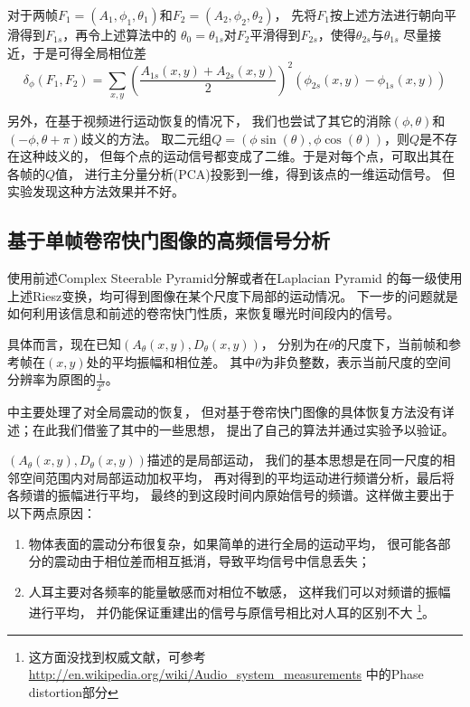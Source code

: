 对于两帧$F_1 = (A_1, \phi_1, \theta_1)$和$F_2 = (A_2, \phi_2, \theta_2)$，
先将$F_1$按上述方法进行朝向平滑得到$F_{1s}$，再令上述算法中的
$\theta_0=\theta_{1s}$对$F_2$平滑得到$F_{2s}$，使得$\theta_{2s}$与$\theta_{1s}$
尽量接近，于是可得全局相位差
\begin{equation}
    \delta_\phi(F_1, F_2) = \sum_{x, y}
    \left(\frac{A_{1s}(x, y) + A_{2s}(x, y)}{2}\right)^2(\phi_{2s}(x, y) -
    \phi_{1s}(x, y))
\end{equation}

另外，在基于视频进行运动恢复的情况下，
我们也尝试了其它的消除$(\phi, \theta)$和$(-\phi, \theta+\pi)$歧义的方法。
取二元组$Q=(\phi\sin(\theta), \phi\cos(\theta))$，则$Q$是不存在这种歧义的，
但每个点的运动信号都变成了二维。于是对每个点，可取出其在各帧的$Q$值，
进行主分量分析(PCA)投影到一维，得到该点的一维运动信号。
但实验发现这种方法效果并不好。


\subsection{基于单帧卷帘快门图像的高频信号分析\label{sec:algo-hf}}
使用前述Complex Steerable Pyramid分解或者在Laplacian Pyramid
的每一级使用上述Riesz变换，均可得到图像在某个尺度下局部的运动情况。
下一步的问题就是如何利用该信息和前述的卷帘快门性质，来恢复曝光时间段内的信号。

具体而言，现在已知$(A_\theta(x, y), D_\theta(x, y))$，
分别为在$\theta$的尺度下，当前帧和参考帧在$(x, y)$处的平均振幅和相位差。
其中$\theta$为非负整数，表示当前尺度的空间分辨率为原图的$\frac{1}{2^\theta}$。

\cite{Davis2014VisualMic}中主要处理了对全局震动的恢复，
但对基于卷帘快门图像的具体恢复方法没有详述；在此我们借鉴了其中的一些思想，
提出了自己的算法并通过实验予以验证。

$(A_\theta(x, y), D_\theta(x, y))$描述的是局部运动，
我们的基本思想是在同一尺度的相邻空间范围内对局部运动加权平均，
再对得到的平均运动进行频谱分析，最后将各频谱的振幅进行平均，
最终的到这段时间内原始信号的频谱。这样做主要出于以下两点原因：
\begin{enumerate}
    \item 物体表面的震动分布很复杂，如果简单的进行全局的运动平均，
        很可能各部分的震动由于相位差而相互抵消，导致平均信号中信息丢失；
    \item 人耳主要对各频率的能量敏感而对相位不敏感，
        这样我们可以对频谱的振幅进行平均，
        并仍能保证重建出的信号与原信号相比对人耳的区别不大
        \footnote{这方面没找到权威文献，可参考
            \url{http://en.wikipedia.org/wiki/Audio\_system\_measurements}
        中的Phase distortion部分}。
\end{enumerate}

